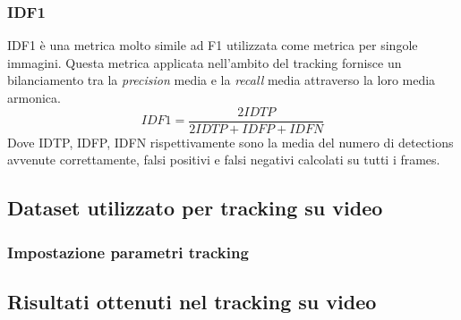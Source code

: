 \subsubsection{IDF1}
IDF1 è una metrica molto simile ad F1 utilizzata come metrica per singole immagini. Questa metrica applicata nell'ambito del tracking fornisce un bilanciamento tra la \textit{precision} media e la \textit{recall} media attraverso la loro media armonica. 
\[
IDF1 = \frac{2IDTP}{2IDTP+IDFP+IDFN}
\]
Dove IDTP, IDFP, IDFN rispettivamente sono la media del numero di detections avvenute correttamente, falsi positivi e falsi negativi calcolati su tutti i frames. 

\subsection{Dataset utilizzato per tracking su video}

\subsubsection{Impostazione parametri tracking}


\subsection{Risultati ottenuti nel tracking su video}